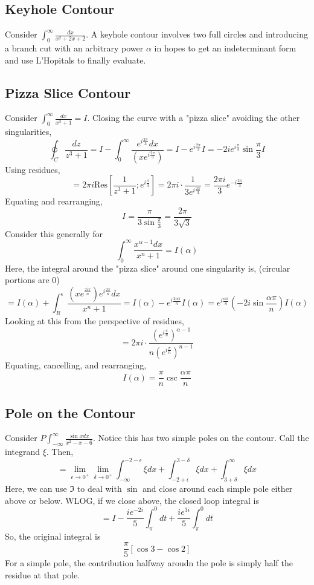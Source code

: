 \documentclass[../main.tex]{subfiles}
\begin{document}
\subsection{Keyhole Contour}
Consider $\int_{0}^{\infty}\frac{dx}{x^{2}+2x+2}$. A keyhole contour involves two full circles and introducing a
branch cut with an arbitrary power $\alpha$ in hopes to get an indeterminant form and use L'Hopitals to finally evaluate.

\subsection{Pizza Slice Contour}
Consider $\int_{0}^{\infty}\frac{dx}{x^{3}+1}=I$. Closing the curve with a "pizza slice" avoiding the other singularities,
$$\oint_{C}\frac{dz}{z^{3}+1}=I-\int_{0}^{\infty}\frac{e^{i\frac{2\pi}{3}}dx}{(xe^{i\frac{2\pi}{3}})}
=I-e^{i\frac{2\pi}{3}}I=-2ie^{i\frac{\pi}{3}}\sin\frac{\pi}{3}I$$
Using residues,
$$=2\pi i\text{Res}[\frac{1}{z^{3}+1};e^{i\frac{\pi}{3}}]=2\pi i\cdot \frac{1}{3e^{i\frac{2\pi}{3}}}
=\frac{2\pi i}{3}e^{-i\frac{2\pi}{3}}$$
Equating and rearranging,
$$I=\frac{\pi}{3\sin\frac{\pi}{3}}=\frac{2\pi}{3\sqrt{3}}$$
Consider this generally for
$$\int_{0}^{\infty}\frac{x^{\alpha -1}dx}{x^{n}+1}=I(\alpha)$$
Here, the integral around the "pizza slice" around one singularity is, (circular portions are 0)
$$=I(\alpha)+\int_{R}^{\epsilon}\frac{(xe^{\frac{2i\pi}{n}})e^{i\frac{2\pi}{n}}dx}{x^{n}+1}
=I(\alpha)-e^{i\frac{2\alpha \pi}{n}}I(\alpha)
=e^{i\frac{\alpha \pi}{n}}(-2i\sin \frac{\alpha\pi}{n})I(\alpha)
$$
Looking at this from the perspective of residues,
$$=2\pi i\cdot \frac{(e^{i\frac{\pi}{n}})^{\alpha -1}}{n(e^{i\frac{\pi}{n}})^{n-1}}$$
Equating, cancelling, and rearranging,
$$\boxed{I(\alpha)=\frac{\pi}{n}\csc \frac{\alpha \pi}{n}}$$

\subsection{Pole on the Contour}
Consider $P\int_{-\infty}^{\infty}\frac{\sin x dx}{x^{2}-x-6}$. Notice this has two simple poles on the contour.
Call the integrand $\xi$. Then,
$$=\lim_{\epsilon\rightarrow 0^{+}}\lim_{\delta\rightarrow 0^{+}}
\int_{-\infty}^{-2-\epsilon}\xi dx+\int_{-2+\epsilon}^{3-\delta}\xi dx
+\int_{3+\delta}^{\infty}\xi dx$$
Here, we can use $\Im$ to deal with $\sin$ and close around each simple pole either above or below.
WLOG, if we close above, the closed loop integral is
$$=I-\frac{ie^{-2i}}{5}\int_{\pi}^{0}dt+\frac{ie^{3i}}{5}\int_{\pi}^{0}dt$$
So, the original integral is
$$\frac{\pi}{5}\left[\cos 3-\cos 2\right]$$
For a simple pole, the contribution halfway aroudn the pole is simply half the residue at that pole.
\end{document}
